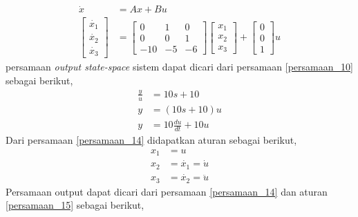 \documentclass[../cover.tex]{subfiles}
\begin{document}
            \begin{equation}
                \begin{split}
                    \dot{x} &= Ax+ Bu \\[10pt]
                    \begin{bmatrix} \dot{x_1} \\ \dot{x_2} \\ \dot{x_3} \end{bmatrix}&=\begin{bmatrix} 0 & 1 & 0 \\ 0 & 0 & 1 \\ -10 & -5 & -6\end{bmatrix} \begin{bmatrix} x_1 \\ x_2 \\x_3 \end{bmatrix} + \begin{bmatrix} 0 \\ 0 \\ 1 \end{bmatrix} u
                \label{persamaan_13}
                \end{split}
            \end{equation}
            persamaan \textit{output state-space} sistem dapat dicari dari persamaan \eqref{persamaan_10} sebagai berikut,
            \begin{equation}
                \begin{split}
                    \frac{y}{u} &= 10s+10 \\[5pt]
                              y &= (10s+10)u \\[5pt]
                              y &= 10\frac{du}{dt} + 10u
                              \label{persamaan_14}
                \end{split}
            \end{equation}
            Dari persamaan \eqref{persamaan_14} didapatkan aturan sebagai berikut,
            \begin{equation}
                \begin{split}
                    x_1 &= u \\[5pt]
                    x_2 &= \dot{x_1} = \dot{u} \\[5pt]
                    x_3 &= \dot{x_2} = \ddot{u}
                    \label{persamaan_15}
                \end{split}
            \end{equation}
            Persamaan output dapat dicari dari persamaan \eqref{persamaan_14} dan aturan \eqref{persamaan_15} sebagai berikut,
\end{document}
